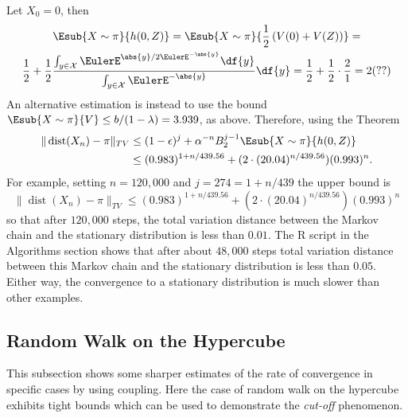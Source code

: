 \documentclass[12pt]{article}
\begin{document}
\begin{example}
    Let \( X_0 = 0 \), then
    \begin{multline*}
        \Esub{X \sim \pi}{h(0,Z)} = \Esub{X \sim \pi}{\frac{1}{2} \left(
        V(0) + V(Z) \right) }= \\
        \frac{1}{2} + \frac{1}{2} \frac{\int_{y \in \mathcal{X}} \EulerE^
        {\abs{y}/2 \EulerE^{-\abs{y}}} \df{y}}{\int_{y \in \mathcal{X}}
        \EulerE^{-\abs{y}}} \df{y} = \frac{1}{2} + \frac{1}{2} \cdot
        \frac{2}{1} = 2 (??)
    \end{multline*}
    An alternative estimation is instead to use the bound \( \Esub{X
    \sim \pi}{V} \le b/(1-\lambda) = 3.939 \), as above.  Therefore,
    using the Theorem
    \begin{align*}
        \|
        \operatorname{dist}
        (X_n) - \pi \|_{TV} &\le (1- \epsilon)^j + \alpha^{-n} B_2^{j-1}
        \Esub{X \sim \pi}{h(0,Z)} \\
        &\le (0.983)^{1 + n/439.56} + (2 \cdot (20.04)^{n/439.56})(0.993)^n.
    \end{align*}
    For example, setting \( n = 120{,}000 \) and \( j = 274 = 1+ n/439 \)
    the upper bound is
    \[
        \|
        \operatorname{dist}
        (X_n) - \pi \|_{TV} \le (0.983)^{1 + n/439.56} + (2 \cdot (20.04)^
        {n/439.56})(0.993)^n
    \] so that after \( 120{,}000 \) steps, the total variation distance
    between the Markov chain and the stationary distribution is less
    than \( 0.01 \).  The R script in the Algorithms section shows that
    after about \( 48{,}000 \) steps total variation distance between
    this Markov chain and the stationary distribution is less than \(
    0.05 \).  Either way, the convergence to a stationary distribution
    is much slower than other examples.

\end{example}

\subsection*{Random Walk on the Hypercube}


This subsection shows some sharper estimates of the rate of convergence
in specific cases by using coupling.  Here the case of random walk on
the hypercube exhibits tight bounds which can be used to demonstrate
the \emph{cut-off} phenomenon.%
\end{document}
